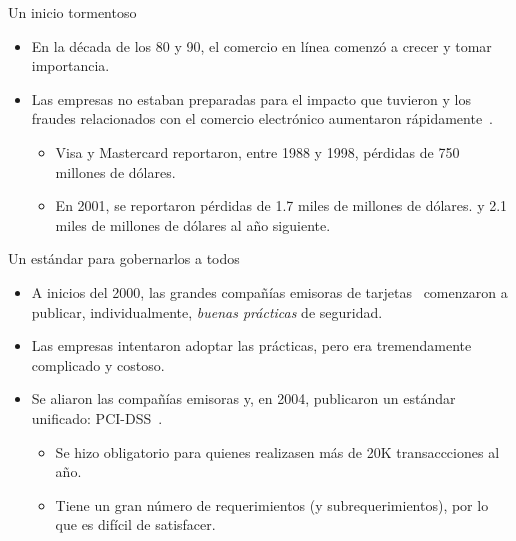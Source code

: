 %
%
%


\begin{frame}{Un inicio tormentoso}
  \begin{itemize}
    \item En la década de los 80 y 90, el comercio en línea comenzó a crecer y
      tomar importancia.
    \item Las empresas no estaban preparadas para el impacto que tuvieron y
      los fraudes relacionados con el comercio electrónico aumentaron
      rápidamente~\cite{search_security}.
      \begin{itemize}
        \item Visa y Mastercard reportaron, entre 1988 y 1998, pérdidas de 750
          millones de dólares.
        \item En 2001, se reportaron pérdidas de 1.7 miles de millones de
          dólares. y  2.1 miles de millones de dólares al año siguiente.
      \end{itemize}
  \end{itemize}
\end{frame}

\begin{frame}{Un estándar para gobernarlos a todos}
  \begin{itemize}
    \item A inicios del 2000, las grandes compañías emisoras de
      tarjetas~\footnotemark{} comenzaron a publicar, individualmente,
      \textit{buenas prácticas} de seguridad.
    \item Las empresas intentaron adoptar las prácticas, pero era tremendamente
      complicado y costoso.
    \item Se aliaron las compañías emisoras y, en 2004, publicaron un estándar
      unificado: PCI-DSS\footnotemark~\cite{pci_dss}.
      \begin{itemize}
        \item Se hizo obligatorio para quienes realizasen más de 20K
          transaccciones al año.
        \item Tiene un gran número de requerimientos (y subrequerimientos), por
          lo que es difícil de satisfacer.
      \end{itemize}
  \end{itemize}


\end{frame}

